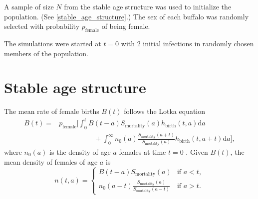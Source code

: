 \documentclass[12pt]{article}
\newcommand{\md}{\mathrm{d}}
\begin{document}
A sample of size $N$ from the stable age structure was used to
initialize the population.  (See \autoref{stable_age_structure}.)  The
sex of each buffalo was randomly selected with probability
$p_{\text{female}}$ of being female.

The simulations were started at $t = 0$ with $2$ initial infections
in randomly chosen members of the population.

\cite{hedger_1972}

\cite{medlock_2020}


\section{Stable age structure}
\label{stable_age_structure}

The mean rate of female births $B(t)$ follows the Lotka equation
\begin{equation}
  \label{lotka}
  \begin{split}
    B(t) =&
    p_{\text{female}} \bigg[
      \int_0^t B(t - a)
      S_{\text{mortality}}(a)
      h_{\text{birth}}(t, a) \md a
    \\
    & \quad\quad\quad\quad\quad {} +
      \int_0^{\infty} n_0(a)
      \frac{S_{\text{mortality}}(a + t)}{S_{\text{mortality}}(a)}
      h_{\text{birth}}(t, a + t) \md a
    \bigg],
  \end{split}
\end{equation}
where $n_0(a)$ is the density of age $a$ females at time $t = 0$
\autocite{harris_1963, kot_01}.
Given $B(t)$, the mean density of females of age $a$ is
\begin{equation}
  n(t, a) =
  \begin{cases}
    B(t - a) S_{\text{mortality}}(a)
    & \text{if $a < t$},
    \\
    n_0(a - t)
    \frac{S_{\text{mortality}}(a)}{S_{\text{mortality}}(a - t)}
    & \text{if $a > t$}.
  \end{cases}
\end{equation}
\end{document}
